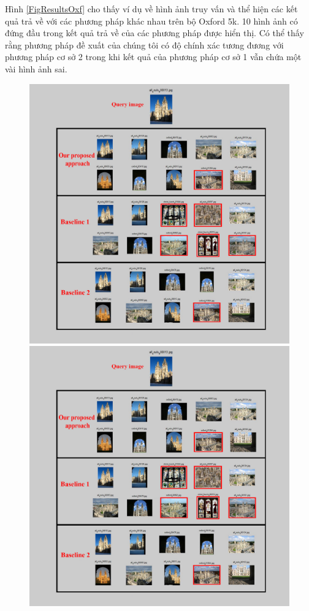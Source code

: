 Hình \ref{FigResultsOxf} cho thấy ví dụ về hình ảnh truy vấn và thể hiện các kết quả trả về với các phương pháp khác nhau trên bộ Oxford 5k. 10 hình ảnh có đứng đầu trong kết quả trả về của các phương pháp được hiển thị. Có thể thấy rằng phương pháp đề xuất của chúng tôi có độ chính xác tương đương với phương pháp cơ sở 2 trong khi kết quả của phương pháp cơ sở 1 vẫn chứa một vài hình ảnh sai.


\begin{figure}[!htbp]
  \begin{center}
    \leavevmode
    \ifpdf
      \includegraphics[scale=0.25]{resOxford5k}
    \else
      \includegraphics[scale=0.25]{resOxford5k}

\end{center}
\end{figure}
